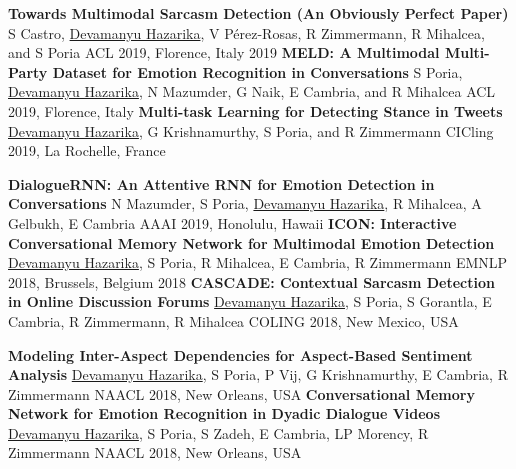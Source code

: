 \begin{cvpublications}
  \cvpublication
    {\textbf{Towards Multimodal Sarcasm Detection (An Obviously Perfect Paper)}}  %
    {S Castro, \underline{Devamanyu Hazarika}, V Pérez-Rosas, R Zimmermann, R Mihalcea, and S Poria} %
    {ACL 2019, Florence, Italy} %
    {2019} %
  \cvpublication
    {\textbf{MELD: A Multimodal Multi-Party Dataset for Emotion Recognition in Conversations}}  %
    {S Poria, \underline{Devamanyu Hazarika}, N Mazumder, G Naik, E Cambria, and R Mihalcea} %
    {ACL 2019, Florence, Italy} %
    {} %
  \cvpublication
    {\textbf{Multi-task Learning for Detecting Stance in Tweets}}  %
    {\underline{Devamanyu Hazarika}, G Krishnamurthy, S Poria, and R Zimmermann} %
    {CICling 2019, La Rochelle, France} %
    {} %

  \cvpublication
    {\textbf{DialogueRNN: An Attentive RNN for Emotion Detection in Conversations}}  %
    {N Mazumder, S Poria, \underline{Devamanyu Hazarika}, R Mihalcea, A Gelbukh, E Cambria} %
    {AAAI 2019, Honolulu, Hawaii} %
    {} %
  \cvpublication
    {\textbf{ICON: Interactive Conversational Memory Network for Multimodal Emotion Detection}}  %
    {\underline{Devamanyu Hazarika}, S Poria, R Mihalcea, E Cambria, R Zimmermann} %
    {EMNLP 2018, Brussels, Belgium} %
    {2018} %
  \cvpublication
    {\textbf{CASCADE: Contextual Sarcasm Detection in Online Discussion Forums}} %
    {\underline{Devamanyu Hazarika}, S Poria, S Gorantla, E Cambria, R Zimmermann, R Mihalcea} %
    {COLING 2018, New Mexico, USA} %
    {} %


  \cvpublication
    {\textbf{Modeling Inter-Aspect Dependencies for Aspect-Based Sentiment Analysis}} %
    {\underline{Devamanyu Hazarika}, S Poria, P Vij, G Krishnamurthy,  E Cambria, R Zimmermann} %
    {NAACL 2018, New Orleans, USA} %
    {} %
  \cvpublication
    {\textbf{Conversational Memory Network for Emotion Recognition in Dyadic Dialogue Videos}} %
    {\underline{Devamanyu Hazarika}, S Poria, S Zadeh, E Cambria, LP Morency, R Zimmermann} %
    {NAACL 2018, New Orleans, USA} %
    {} %


\end{cvpublications}
